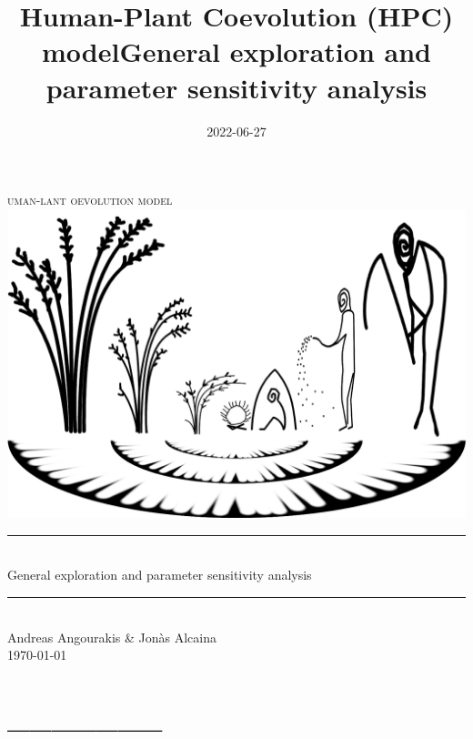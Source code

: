 \documentclass[
]{book}
\title{Human-Plant Coevolution (HPC) modelGeneral exploration and parameter sensitivity analysis}
\author{}
\date{\vspace{-2.5em}2022-06-27}
\begin{document}
\maketitle

\newcommand{\HRule}{\rule{\linewidth}{0.5mm}}


\begin{center}

\textsc{\LARGE
{}uman-lant oevolution model} 
\\[1cm]
\includegraphics[width=\textwidth]{images/hpcModel-logo_v2.png}
\\[1.5cm]
\HRule \\[0.4cm]
{ \huge General exploration and parameter sensitivity analysis \\[0.15cm] }
\HRule \\[1.5cm]
Andreas Angourakis \& Jon\`{a}s Alcaina
\\[1cm]
\today \\ [1cm]

\end{center}

\newpage
{}

{
\hypersetup{linkcolor=}
\setcounter{tocdepth}{1}
\tableofcontents
}
\hypertarget{section}{%
\chapter*{\_\_\_\_\_\_\_}\label{section}}
\end{document}
